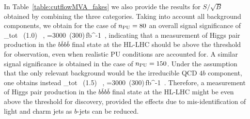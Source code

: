 In Table~\ref{table:cutflowMVA_fakes} we also provide
the results for $S/\sqrt{B}$ obtained by
combining the three categories.
%
Taking into
account all background components, we obtain for the case
of $n_{\rm PU}=80$
an overall signal
significance of
\be
\lp {}\rp_{\rm tot} ~(1.0) \, ,\quad
{}=3000~(300)\,{\rm fb}^{-1}\, ,
\ee
%
indicating  that a measurement of
Higgs pair production in the $b\bar{b}b\bar{b}$ final state at the HL-LHC
should be 
above the threshold for observation, even when realistic PU conditions
are accounted for.
%
A similar signal significance is obtained in the case of
$n_{\rm PU}=150$.
%
Under the  assumption that
    the only relevant background would be the irreducible QCD $4b$ component,
    one obtains instead
    \be
\lp {}\rp_{\rm tot} ~(1.5) \, ,\quad
{}=3000~(300)\,{\rm fb}^{-1}\, .
\ee
%
Therefore, a measurement of Higgs pair production
in the $b\bar{b}b\bar{b}$ final state at the
HL-LHC  might be even above the threshold for discovery, provided
the effects due to mis-identification of light and charm jets as
$b$-jets can be reduced.
%
